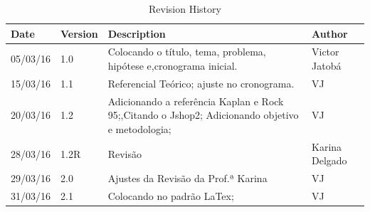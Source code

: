 \documentclass[
12pt,				%
oneside,			%
a4paper,			%
english,			%
brazil				%
]{abntex2ppgsi}
\begin{document}
%
%
%
%
\begin{errata}
	
\begin{table}[]
	\centering
	\caption{Revision History}
	\label{revision_history}
	\begin{tabular}{p{1.4in} p{1.4in} p{2.4in} p{1.4in} } \hline
		\textbf{Date} & \textbf{Version} & \textbf{Description} & \textbf{Author}
		\\ \hline
		05/03/16      & 1.0              & Colocando o título, tema, problema, hipótese e,cronograma inicial.   & Victor Jatobá   \\ \hline
		15/03/16      & 1.1              & Referencial Teórico; ajuste no cronograma.                                                       & VJ              \\ \hline
		20/03/16      & 1.2              & Adicionando a referência Kaplan e Rock 95;,Citando o Jshop2; Adicionando objetivo e metodologia; & VJ              \\ \hline
		28/03/16      & 1.2R             & Revisão                                                                                          & Karina Delgado  \\ \hline
		29/03/16      & 2.0              & Ajustes da Revisão da Prof.ª Karina                                                              & VJ              \\ \hline
		31/03/16      & 2.1              & Colocando no padrão LaTex;                                                                       & VJ              \\ \hline
	\end{tabular}
\end{table}

\end{errata}
\end{document}
